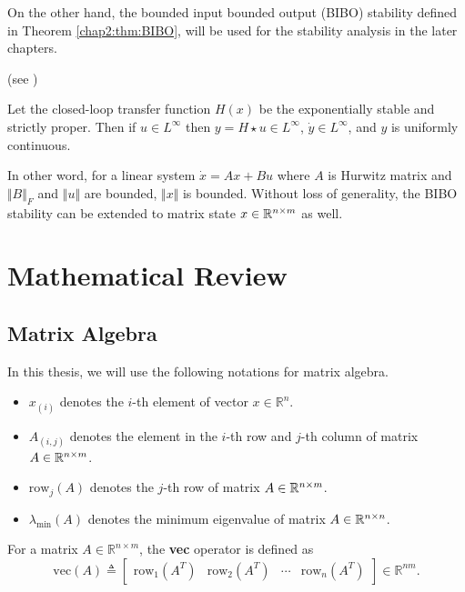 
On the other hand, the bounded input bounded output (BIBO) stability defined in Theorem \ref{chap2:thm:BIBO}, will be used for the stability analysis in the later chapters.

\begin{theorem}(see \cite[Theorem 1.9]{RN23})

  Let the closed-loop transfer function $H(x)$ be the exponentially stable and strictly proper.
  Then if $u\in L^\infty$ then $y = H\star u\in L^\infty$, $\dot y\in L^\infty$, and $y$ is uniformly continuous.
  \label{chap2:thm:BIBO}
\end{theorem}

In other word, for a linear system $\dot x=Ax+Bu$ where $A$ is Hurwitz matrix and $\Vert B\Vert_F$ and $\Vert u\Vert$ are bounded, $\Vert x\Vert$ is bounded.
Without loss of generality, the BIBO stability can be extended to matrix state $x\in\mathbb{R}^{n\times m}$ as well.

\section{Mathematical Review} 

\subsection{Matrix Algebra} 

In this thesis, we will use the following notations for matrix algebra.
\begin{itemize}
  \item $x_{(i)}$ denotes the $i$-th element of vector $x\in\mathbb R^n$.
  \item $A_{(i,j)}$ denotes the element in the $i$-th row and $j$-th column of matrix $A\in\mathbb{R}^{n\times m}$.
  \item $\text{row}_j(A)$ denotes the $j$-th row of matrix $A\in\mathbb{R}^{n\times m}$.
  \item $\lambda_\text{min}(A)$ denotes the minimum eigenvalue of matrix $A\in\mathbb{R}^{n\times n}$.
\end{itemize}

For a matrix $A\in\mathbb R^{n\times m}$, the \textbf{vec} operator is defined as
\begin{equation}
  \text{vec}(A) \triangleq 
  \begin{bmatrix}
      \text{row}_1(A^T) & \text{row}_2(A^T) & \cdots & \text{row}_n(A^T)
  \end{bmatrix}
  \in\mathbb R^{nm}
  .
\end{equation}

